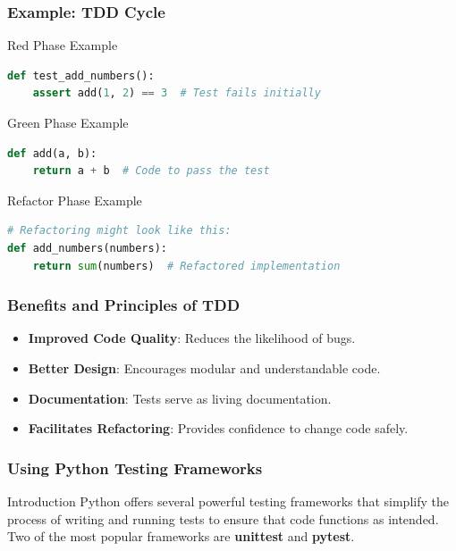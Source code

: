 \documentclass{beamer}
\begin{document}
\begin{frame}[fragile]
    \frametitle{Example: TDD Cycle}
    \begin{block}{Red Phase Example}
        \begin{lstlisting}[language=python]
def test_add_numbers():
    assert add(1, 2) == 3  # Test fails initially
        \end{lstlisting}
    \end{block}
    
    \begin{block}{Green Phase Example}
        \begin{lstlisting}[language=python]
def add(a, b):
    return a + b  # Code to pass the test
        \end{lstlisting}
    \end{block}
    
    \begin{block}{Refactor Phase Example}
        \begin{lstlisting}[language=python]
# Refactoring might look like this:
def add_numbers(numbers):
    return sum(numbers)  # Refactored implementation
        \end{lstlisting}
    \end{block}
\end{frame}

\begin{frame}
    \frametitle{Benefits and Principles of TDD}
    \begin{itemize}
        \item \textbf{Improved Code Quality}: Reduces the likelihood of bugs.
        \item \textbf{Better Design}: Encourages modular and understandable code.
        \item \textbf{Documentation}: Tests serve as living documentation.
        \item \textbf{Facilitates Refactoring}: Provides confidence to change code safely.
    \end{itemize}
\end{frame}

\begin{frame}
    \frametitle{Using Python Testing Frameworks}
    \begin{block}{Introduction}
        Python offers several powerful testing frameworks that simplify the process of writing and running tests to ensure that code functions as intended. Two of the most popular frameworks are \textbf{unittest} and \textbf{pytest}.
    \end{block}
\end{frame}
\end{document}
